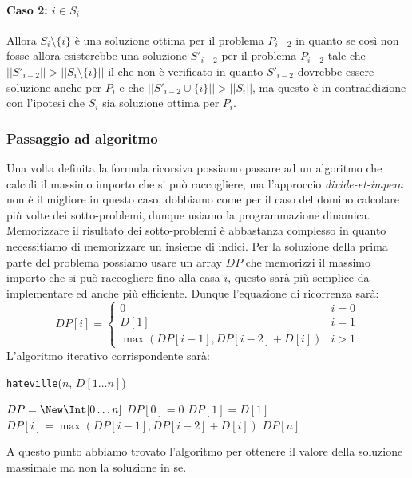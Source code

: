                 \paragraph{Caso 2: $i\in S_i$} Allora $S_i\setminus \{i\}$ è una soluzione ottima per il problema $P_{i-2}$ in quanto se così non fosse allora esisterebbe una soluzione $S'_{i-2}$ per il problema $P_{i-2}$ tale che $||S'_{i-2}||>||S_i\setminus \{i\}||$ il che non è verificato in quanto $S'_{i-2}$ dovrebbe essere soluzione anche per $P_i$ e che $||S'_{i-2}\cup \{i\}||>||S_i||$, ma questo è in contraddizione con l'ipotesi che $S_i$ sia soluzione ottima per $P_i$.
            \subsubsection{Passaggio ad algoritmo}
                Una volta definita la formula ricorsiva possiamo passare ad un algoritmo che calcoli il massimo importo che si può raccogliere, ma l'approccio \textit{divide-et-impera} non è il migliore in questo caso, dobbiamo come per il caso del domino calcolare più volte dei sotto-problemi, dunque usiamo la programmazione dinamica.\newline
                Memorizzare il risultato dei sotto-problemi è abbastanza complesso in quanto necessitiamo di memorizzare un insieme di indici. Per la soluzione della prima parte del problema possiamo usare un array $DP$ che memorizzi il massimo importo che si può raccogliere fino alla casa $i$, questo sarà più semplice da implementare ed anche più efficiente. Dunque l'equazione di ricorrenza sarà:
                $$
                    DP[i] = \begin{cases}
                        0 & i=0 \\
                        D[1] & i=1 \\
                        \max(DP[i-1], DP[i-2]+D[i]) & i>1
                    \end{cases}
                $$
                L'algoritmo iterativo corrispondente sarà:
                \begin{algorithm}[H]
                    \caption{\Int \texttt{hateville}(\Int $n$, \Int $D[1 \ldots n]$)}
                    \begin{algorithmic}
                        \State \Int[] $DP = \New \Int[0 \ldots n]$
                        \State $DP[0] = 0$
                        \State $DP[1] = D[1]$
                            \State $DP[i] = \max(DP[i-1], DP[i-2]+D[i])$
                        \EndFor
                        \State \Return $DP[n]$
                    \end{algorithmic}
                \end{algorithm}
                A questo punto abbiamo trovato l'algoritmo per ottenere il valore della soluzione massimale ma non la soluzione in se.
